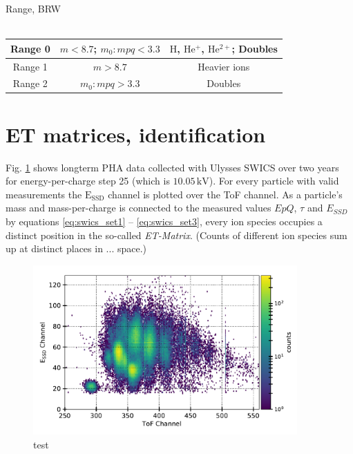 Range, BRW\\ \\
\begin{tabular}{c|c|c}
	Range 0 & $m < 8.7$;  $m_0 : mpq < 3.3$ & $\mathrm{H}$, $\mathrm{He^+}$, $\mathrm{He^{2+}}$; Doubles\\ 
	\hline 
	Range 1 & $m > 8.7$ & Heavier ions \\ 
	\hline 
	Range 2 & $m_0 : mpq > 3.3$ & Doubles \\ 
\end{tabular} 

%
%
%

\section{ET matrices, identification}
Fig. \ref{fig:et_matrix} shows longterm PHA data collected with Ulysses SWICS over two years for energy-per-charge step 25 (which is $10.05\,\mathrm{kV}$). For every particle with valid measurements the $\mathrm{E_{SSD}}$ channel is plotted over the ToF channel. As a particle's mass and mass-per-charge is connected to the measured values $EpQ$, $\tau$ and $E_{SSD}$ by equations \ref{eq:swics_set1} --  \ref{eq:swics_set3}, every ion species occupies a distinct position in the so-called \textit{ET-Matrix}. (Counts of different ion species sum up at distinct places in ... space.)


\begin{figure}[h]
	\includegraphics[width=0.9\textwidth]{Figures/et_matrix.pdf}
	\centering
	\caption{test}
	\label{fig:et_matrix}
\end{figure}


